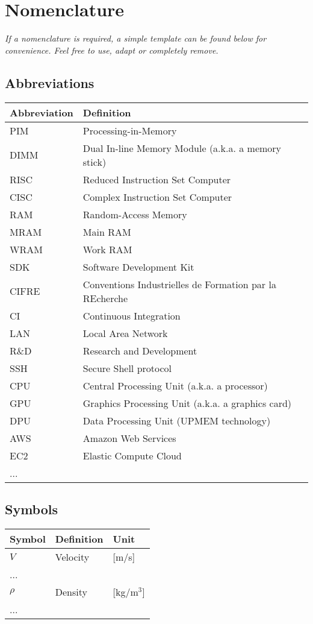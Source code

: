 \chapter*{Nomenclature}

\emph{If a nomenclature is required, a simple template can be found below for convenience. Feel free to use, adapt or completely remove.}

\section*{Abbreviations}

\begin{longtable}{p{2.5cm}p{8cm}}
    \toprule
    Abbreviation & Definition \\
    \midrule\endhead %
    PIM & Processing-in-Memory \\
    DIMM & Dual In-line Memory Module (a.k.a. a memory stick) \\
    RISC & Reduced Instruction Set Computer \\
    CISC & Complex Instruction Set Computer \\
    RAM & Random-Access Memory \\
    MRAM & Main RAM \\
    WRAM & Work RAM \\
    SDK & Software Development Kit \\
    CIFRE & Conventions Industrielles de Formation par la REcherche \\
    CI & Continuous Integration \\
    LAN & Local Area Network \\
    R\&D & Research and Development \\
    SSH & Secure Shell protocol \\
    CPU & Central Processing Unit (a.k.a. a processor) \\
    GPU & Graphics Processing Unit (a.k.a. a graphics card) \\
    DPU & Data Processing Unit (UPMEM technology) \\
    AWS & Amazon Web Services \\
    EC2 & Elastic Compute Cloud \\
    ... \\
    \bottomrule
\end{longtable}

\section*{Symbols}

\begin{longtable}{p{2.5cm}p{8cm}p{2.5cm}}
    \toprule
    Symbol & Definition & Unit \\
    \midrule\endhead %
    $V$ & Velocity & [m/s] \\
    ... \\
    \midrule %
    $\rho$ & Density & [kg/m$^3$] \\
    ... \\
    \bottomrule
\end{longtable}

